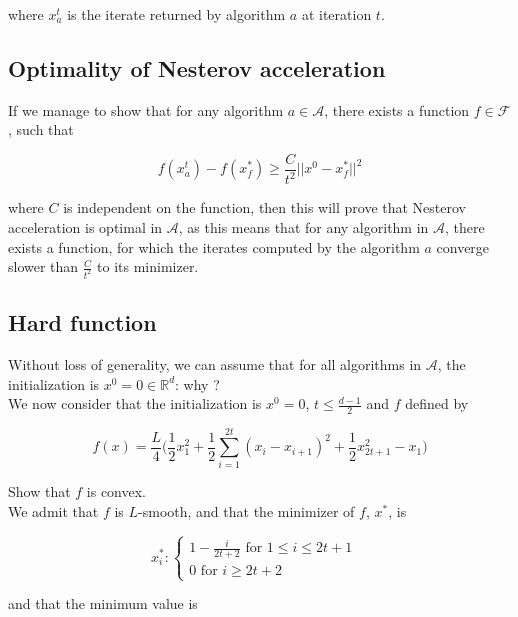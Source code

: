 \documentclass[
10pt, %
a4paper, %
oneside, %
headinclude,footinclude, %
BCOR5mm, %
]{scrartcl}
\begin{document}
where $x^t_a$ is the iterate returned by algorithm $a$ at iteration $t$.

\subsection{\large\color{MidnightBlue}Optimality of Nesterov acceleration}

If we manage to show that for any algorithm $a\in \mathcal{A}$, there exists a function $f\in \mathcal{F} $, such that 

\begin{equation}
    f(x_a^t)-f(x_f^*)\geq \frac{C}{t^2} ||x^0-x_f^*||^2
\end{equation}

where $C$ is independent on the function, then this will prove that Nesterov acceleration is optimal in $ \mathcal{A} $, as this means that for any algorithm in $ \mathcal{A} $, there exists a function, for which the iterates computed by the algorithm $a$ converge slower than $ \frac{C}{t^2} $ to its minimizer.

\subsection{\large\color{MidnightBlue}Hard function}

\exercice{\textbf{}} Without loss of generality, we can assume that for all algorithms in $ \mathcal{A}$, the initialization is $x^0=0\in \mathbb{R}^d$: why ?
\\

We now consider that the initialization is $x^0=0$, $t\leq\frac{d-1}{2} $ and $f$ defined by

\begin{equation}
    f(x) = \frac{L}{4} \Big( \frac{1}{2} x_1^2 + \frac{1}{2} \sum^{2t}_{i=1} (x_i-x_{i+1})^2+ \frac{1}{2} x_{2t+1}^2-x_1 \Big)
\end{equation}

\exercice{\textbf{}}Show that $f$ is convex.
\\

We admit that $f$ is $L$-smooth, and that the minimizer of $f$, $x^*$, is

$$
x_i^*  : \left\{
    \begin{array}{ll}
	1  - \frac{i}{2t+2} \text{ for } 1\leq i \leq 2t+1 & \\
	0 \text{ for } i\geq 2t+2
    \end{array}
\right.
$$

and that the minimum value is
\end{document}

